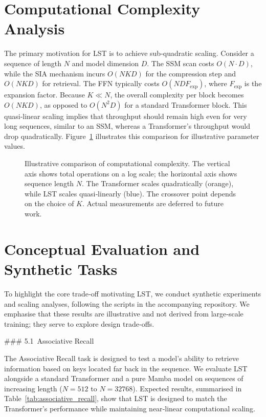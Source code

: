 \documentclass[10pt,twocolumn,letterpaper]{article}
\begin{document}
\section{Computational Complexity Analysis}

The primary motivation for LST is to achieve sub‑quadratic scaling.  Consider a sequence of length $N$ and model dimension $D$.  The SSM scan costs $O(N\cdot D)$, while the SIA mechanism incurs $O(NK D)$ for the compression step and $O(NK D)$ for retrieval.  The FFN typically costs $O(N D F_{\mathrm{exp}})$, where $F_{\mathrm{exp}}$ is the expansion factor.  Because $K\ll N$, the overall complexity per block becomes $O(NK D)$, as opposed to $O(N^2 D)$ for a standard Transformer block.  This quasi‑linear scaling implies that throughput should remain high even for very long sequences, similar to an SSM, whereas a Transformer's throughput would drop quadratically.  Figure \ref{fig:scaling} illustrates this comparison for illustrative parameter values.

\begin{figure}[t]
\centering
{}
\caption{Illustrative comparison of computational complexity.  The vertical axis shows total operations on a log scale; the horizontal axis shows sequence length $N$.  The Transformer scales quadratically (orange), while LST scales quasi‑linearly (blue).  The crossover point depends on the choice of $K$.  Actual measurements are deferred to future work.}
\label{fig:scaling}
\end{figure}

\section{Conceptual Evaluation and Synthetic Tasks}

To highlight the core trade‑off motivating LST, we conduct synthetic experiments and scaling analyses, following the scripts in the accompanying repository.  We emphasise that these results are illustrative and not derived from large‑scale training; they serve to explore design trade‑offs.

### 5.1 Associative Recall

The Associative Recall task is designed to test a model's ability to retrieve information based on keys located far back in the sequence.  We evaluate LST alongside a standard Transformer and a pure Mamba model on sequences of increasing length ($N=512$ to $N=32768$).  Expected results, summarised in Table \ref{tab:associative_recall}, show that LST is designed to match the Transformer's performance while maintaining near‑linear computational scaling.
\end{document}
